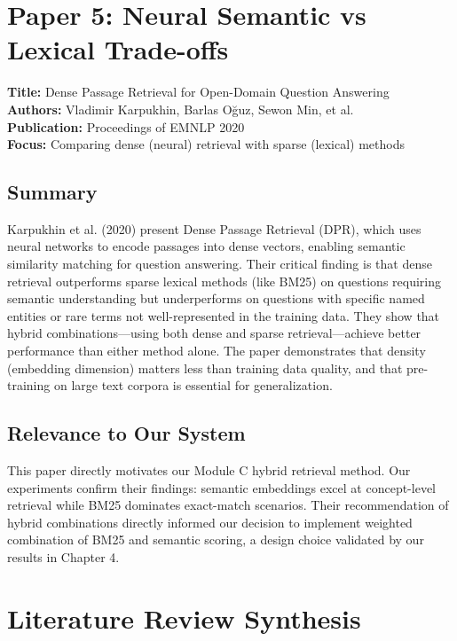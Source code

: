 \documentclass[12pt,a4paper]{report}
\begin{document}
\vspace{0.5cm}

\section{Paper 5: Neural Semantic vs Lexical Trade-offs}

\textbf{Title:} Dense Passage Retrieval for Open-Domain Question Answering \\
\textbf{Authors:} Vladimir Karpukhin, Barlas O\u{g}uz, Sewon Min, et al. \\
\textbf{Publication:} Proceedings of EMNLP 2020 \\
\textbf{Focus:} Comparing dense (neural) retrieval with sparse (lexical) methods

\subsection*{Summary}

Karpukhin et al. (2020) present Dense Passage Retrieval (DPR), which uses neural networks to encode passages into dense vectors, enabling semantic similarity matching for question answering. Their critical finding is that dense retrieval outperforms sparse lexical methods (like BM25) on questions requiring semantic understanding but underperforms on questions with specific named entities or rare terms not well-represented in the training data. They show that hybrid combinations---using both dense and sparse retrieval---achieve better performance than either method alone. The paper demonstrates that density (embedding dimension) matters less than training data quality, and that pre-training on large text corpora is essential for generalization.

\subsection*{Relevance to Our System}

This paper directly motivates our Module C hybrid retrieval method. Our experiments confirm their findings: semantic embeddings excel at concept-level retrieval while BM25 dominates exact-match scenarios. Their recommendation of hybrid combinations directly informed our decision to implement weighted combination of BM25 and semantic scoring, a design choice validated by our results in Chapter 4.

\vspace{0.5cm}

\section{Literature Review Synthesis}
\end{document}

